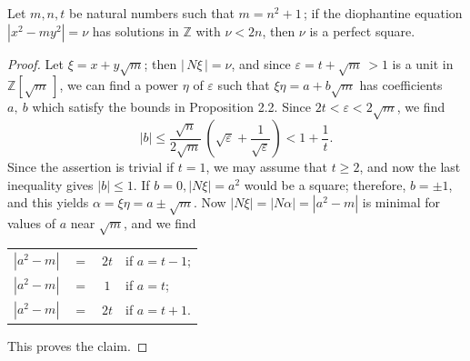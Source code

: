 \documentclass[10pt,a4paper]{amsart}
\newcommand{\Z}{{\mathbb Z}}
\newcommand{\eps}{\varepsilon}
\begin{document}
\begin{prop}\label{th3}
Let $m, n, t$ be natural numbers such that $m = n^2+1\,$; if
the diophantine equation $|x^2 - my^2| = \nu$ has solutions in
$\Z$ with $\nu < 2n$, then $\nu$ is a perfect square.
\end{prop}

\begin{proof}
 Let $\xi = x+y\sqrt{m}$; then $|\,N \xi\,| = \nu$, and since
$\eps =t+\sqrt{m}\,>1$ is a unit in $\Z[\sqrt{m}\,]$,
we can find a power $\eta$ of $\eps$ such that
$\xi \eta=a+b\sqrt{m}$ has coefficients $a, \ b$ which satisfy
the bounds in Proposition 2.2. Since $2t<\eps < 2\sqrt{m}$,
we find
\[|b| \leq \frac{\sqrt{n}}{2\sqrt{m}}\, \left( \sqrt{\eps}
  +\frac{1}{\sqrt{\eps}}\right) < 1+\frac{1}{t}.\]
Since the assertion is trivial if $t=1$, we may assume that
$t \ge2$, and now the last inequality gives $|b| \leq 1$.
If $b=0, |N\xi|=a^{2}$ would be a square; therefore,
$b=\pm 1$, and this yields $\alpha = \xi \eta=a \pm \sqrt{m}.$
Now $|N\xi| = |N\alpha| = |a^{2}-m|$ is minimal for
values of $a$ near $\sqrt{m}$, and we find

\begin{tabular}{lccl}
$|a^{2}-m|$ & $=$ & $2t$ & if $a=t-1$;\\
$|a^{2}-m|$ & $=$ & $ 1$ & if $a=t$;  \\
$|a^{2}-m|$ & $=$ & $2t$ & if $a=t+1$.
\end{tabular}

\noindent
This proves the claim.
\end{proof}
\end{document}
